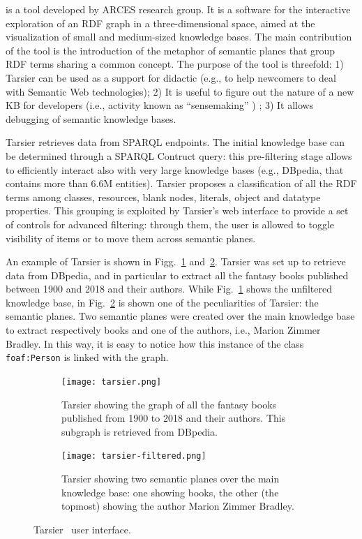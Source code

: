\begin{description}[wide, labelindent=0pt]
\item[Tarsier] is a tool developed by ARCES research group. It is a software for the interactive exploration of an RDF graph in a three-dimensional space, aimed at the visualization of small and medium-sized knowledge bases. The main contribution of the tool is the introduction of the metaphor of semantic planes that group RDF terms sharing a common concept. The purpose of the tool is threefold: 1) Tarsier can be used as a support for didactic (e.g., to help newcomers to deal with Semantic Web technologies); 2) It is useful to figure out the nature of a new KB for developers (i.e., activity known as ``sensemaking'' \cite{motta2011novel}) ; 3) It allows debugging of semantic knowledge bases.

Tarsier retrieves data from SPARQL endpoints. The initial knowledge base can be determined through a SPARQL Contruct query: this pre-filtering stage allows to efficiently interact also with very large knowledge bases (e.g., DBpedia, that contains more than 6.6M entities). Tarsier proposes a classification of all the RDF terms among classes, resources, blank nodes, literals, object and datatype properties. This grouping is exploited by Tarsier's web interface to provide a set of controls for advanced filtering: through them, the user is allowed to toggle visibility of items or to move them across semantic planes.  

An example of Tarsier is shown in Figg.~\ref{fig:tarsier} and~\ref{fig:tarsier-filter}. Tarsier was set up to retrieve data from DBpedia, and in particular to extract all the fantasy books published between 1900 and 2018 and their authors. While Fig.~\ref{fig:tarsier} shows the unfiltered knowledge base, in Fig.~\ref{fig:tarsier-filter} is shown one of the peculiarities of Tarsier: the semantic planes. Two semantic planes were created over the main knowledge base to extract respectively books and one of the authors, i.e., Marion Zimmer Bradley. In this way, it is easy to notice how this instance of the class \texttt{foaf:Person} is linked with the graph.
\begin{figure}[!t]
    \begin{subfigure}[b]{0.5\textwidth}
    \centering
        \texttt{[image: tarsier.png]}
        \caption{Tarsier showing the graph of all the fantasy books published from 1900 to 2018 and their authors. This subgraph is retrieved from DBpedia.}
        \label{fig:tarsier}
    \end{subfigure}
    \hspace{0.5cm}
    \begin{subfigure}[b]{0.5\textwidth}
    \centering
        \texttt{[image: tarsier-filtered.png]}
	\caption{Tarsier showing two semantic planes over the main knowledge base: one showing books, the other (the topmost) showing the author Marion Zimmer Bradley.}
    \label{fig:tarsier-filter}
    \end{subfigure}
    \caption{Tarsier~\cite{viola2018interactive} user interface.}
    \label{fig:tarsier_figs}
\end{figure}


\end{description}
